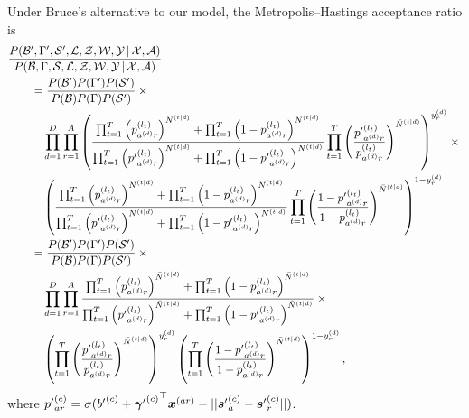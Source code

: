 \documentclass[10pt,english,oneside]{article}
\begin{document}
Under Bruce's alternative to our model, the Metropolis--Hastings
acceptance ratio is
\begin{align}
&\frac{P(\mathcal{B}', \Gamma', \mathcal{S}', \mathcal{L},
    \mathcal{Z}, \mathcal{W}, \mathcal{Y} \,|\, \mathcal{X},
    \mathcal{A})}{P(\mathcal{B}, \Gamma, \mathcal{S}, \mathcal{L},
    \mathcal{Z}, \mathcal{W}, \mathcal{Y} \,|\, \mathcal{X},
    \mathcal{A})}\notag \\
  &\qquad =
  \frac{P(\mathcal{B}')P(\Gamma')P(\mathcal{S}')}{P(\mathcal{B})P(\Gamma)
  P(\mathcal{S}')}\times{} \notag\\
  &\qquad \quad \prod_{d=1}^D \prod_{r=1}^A \left(
  \frac{
    \prod_{t=1}^T \left(
    p^{(l_t)}_{a^{(d)}r}\right)^{\bar{N}^{(t|d)}} + \prod_{t=1}^T
    \left( 1 - p^{(l_t)}_{a^{(d)}r}\right)^{\bar{N}^{(t|d)}}
  }{
    \prod_{t=1}^T \left(
    {p'}^{(l_t)}_{a^{(d)}r}\right)^{\bar{N}^{(t|d)}} + \prod_{t=1}^T
    \left( 1 - {p'}^{(l_t)}_{a^{(d)}r}\right)^{\bar{N}^{(t|d)}}
  }
  \prod_{t=1}^T \left( \frac{ {p'}^{(l_t)}_{a^{(d)}r}}{p^{(l_t)}_{a^{(d)}r}} \right)^{\bar{N}^{(t|d)}}  
  \right)^{y^{(d)}_r} \times {} \notag \\
  &\qquad \quad \left(
  \frac{
    \prod_{t=1}^T \left(
    p^{(l_t)}_{a^{(d)}r}\right)^{\bar{N}^{(t|d)}} + \prod_{t=1}^T
    \left( 1 - p^{(l_t)}_{a^{(d)}r}\right)^{\bar{N}^{(t|d)}}
  }{
    \prod_{t=1}^T \left(
    {p'}^{(l_t)}_{a^{(d)}r}\right)^{\bar{N}^{(t|d)}} + \prod_{t=1}^T
    \left( 1 - {p'}^{(l_t)}_{a^{(d)}r}\right)^{\bar{N}^{(t|d)}}
  }
  \prod_{t=1}^T \left( \frac{1 - {p'}^{(l_t)}_{a^{(d)}r}}{1 - p^{(l_t)}_{a^{(d)}r}} \right)^{\bar{N}^{(t|d)}}    
  \right)^{1 - y^{(d)}_r}\\
  &\qquad =   \frac{P(\mathcal{B}')P(\Gamma')P(\mathcal{S}')}{P(\mathcal{B})P(\Gamma)
  P(\mathcal{S}')}\times{} \notag\\  
  &\qquad \quad \prod_{d=1}^D \prod_{r=1}^A
  \frac{
    \prod_{t=1}^T \left(
    p^{(l_t)}_{a^{(d)}r}\right)^{\bar{N}^{(t|d)}} + \prod_{t=1}^T
    \left( 1 - p^{(l_t)}_{a^{(d)}r}\right)^{\bar{N}^{(t|d)}}
  }{
    \prod_{t=1}^T \left(
    {p'}^{(l_t)}_{a^{(d)}r}\right)^{\bar{N}^{(t|d)}} + \prod_{t=1}^T
    \left( 1 - {p'}^{(l_t)}_{a^{(d)}r}\right)^{\bar{N}^{(t|d)}}
  } \times {} \notag \\
&\qquad \quad   \left( \prod_{t=1}^T \left(\frac{{p'}^{(l_t)}_{a^{(d)}r}}{p^{(l_t)}_{a^{(d)}r}} \right)^{\bar{N}^{(t|d)}} \right)^{y^{(d)}_r}
  \left( \prod_{t=1}^T \left( \frac{1 - {p'}^{(l_t)}_{a^{(d)}r}}{1 - p^{(l_t)}_{a^{(d)}r}} \right)^{\bar{N}^{(t|d)}} \right)^{1 -y^{(d)}_r},
\end{align}
where ${p'}^{(c)}_{ar} = \sigma({b'}^{(c)} + {{\boldsymbol{\gamma}'}^{(c)}}^{\top}
\boldsymbol{x}^{(ar)} - ||{\boldsymbol{s}'}^{(c)}_a - {\boldsymbol{s}'}^{(c)}_r||)$.
\end{document}
